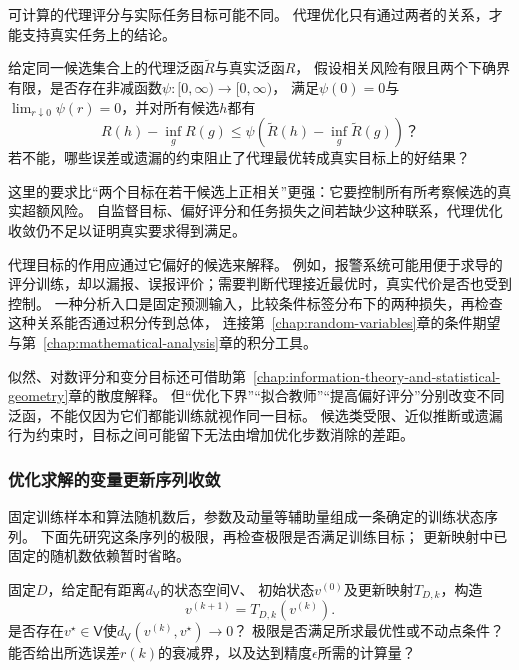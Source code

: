 可计算的代理评分与实际任务目标可能不同。
代理优化只有通过两者的关系，才能支持真实任务上的结论。

\begin{mathproblem}[代理泛函能否支持真实目标]
  \label{question:future-proxy-risk}
  给定同一候选集合上的代理泛函$\widetilde R$与真实泛函$R$，
  假设相关风险有限且两个下确界有限，是否存在非减函数$\psi:[0,\infty)\to[0,\infty)$，
  满足$\psi(0)=0$与$\lim_{r\downarrow0}\psi(r)=0$，并对所有候选$h$都有
  \[
    R(h)-\inf_gR(g)
    \leq\psi\!\left(\widetilde R(h)-\inf_g\widetilde R(g)\right)\text{？}
  \]
  若不能，哪些误差或遗漏的约束阻止了代理最优转成真实目标上的好结果？
\end{mathproblem}

这里的要求比“两个目标在若干候选上正相关”更强：它要控制所有所考察候选的真实超额风险。
自监督目标、偏好评分和任务损失之间若缺少这种联系，代理优化收敛仍不足以证明真实要求得到满足。

代理目标的作用应通过它偏好的候选来解释。
例如，报警系统可能用便于求导的评分训练，却以漏报、误报评价；需要判断代理接近最优时，真实代价是否也受到控制。
一种分析入口是固定预测输入，比较条件标签分布下的两种损失，再检查这种关系能否通过积分传到总体，
连接第~\ref{chap:random-variables}章的条件期望与第~\ref{chap:mathematical-analysis}章的积分工具。

似然、对数评分和变分目标还可借助第~\ref{chap:information-theory-and-statistical-geometry}章的散度解释。
但“优化下界”“拟合教师”“提高偏好评分”分别改变不同泛函，不能仅因为它们都能训练就视作同一目标。
候选类受限、近似推断或遗漏行为约束时，目标之间可能留下无法由增加优化步数消除的差距。

\subsubsection{优化求解的变量更新序列收敛}
\label{sec:future-analysis-convergence}

固定训练样本和算法随机数后，参数及动量等辅助量组成一条确定的训练状态序列。
下面先研究这条序列的极限，再检查极限是否满足训练目标；
更新映射中已固定的随机数依赖暂时省略。

\begin{mathproblem}[训练序列的极限与速度]
  \label{question:future-convergence}
  固定$D$，给定配有距离$d_{\mathsf V}$的状态空间$\mathsf V$、
  初始状态$v^{(0)}$及更新映射$T_{D,k}$，构造
  \[
    v^{(k+1)}=T_{D,k}(v^{(k)}).
  \]
  是否存在$v^\star\in\mathsf V$使$d_{\mathsf V}(v^{(k)},v^\star)\to0$？
  极限是否满足所求最优性或不动点条件？
  能否给出所选误差$r(k)$的衰减界，以及达到精度$\epsilon$所需的计算量？
\end{mathproblem}

